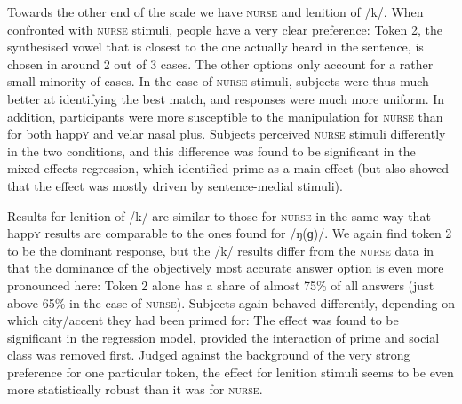 Towards the other end of the scale we have \textsc{nurse} and lenition of /k/.
When confronted with \textsc{nurse} stimuli, people have a very clear preference: Token 2, the synthesised vowel that is closest to the one actually heard in the sentence, is chosen in around 2 out of 3 cases.
The other options only account for a rather small minority of cases.
In the case of \textsc{nurse} stimuli, subjects were thus much better at identifying the best match, and responses were much more uniform.
In addition, participants were more susceptible to the  manipulation for \textsc{nurse} than for both happ\textsc{y} and velar nasal plus.
Subjects perceived \textsc{nurse} stimuli differently in the two  conditions, and this difference was found to be significant in the mixed-effects regression, which identified prime as a main effect (but also showed that the effect was mostly driven by sentence-medial stimuli).

Results for lenition of /k/ are similar to those for \textsc{nurse} in the same way that happ\textsc{y} results are comparable to the ones found for /ŋ(ɡ)/.
We again find token 2 to be the dominant response, but the /k/ results differ from the \textsc{nurse} data in that the dominance of the objectively most accurate answer option is even more pronounced here: Token 2 alone has a share of almost 75\% of all answers (just above 65\% in the case of \textsc{nurse}).
Subjects again behaved differently, depending on which city/accent they had been primed for: The  effect was found to be significant in the regression model, provided the interaction of prime and social class was removed first.
Judged against the background of the very strong preference for one particular token, the  effect for lenition stimuli seems to be even more statistically robust than it was for \textsc{nurse}.

